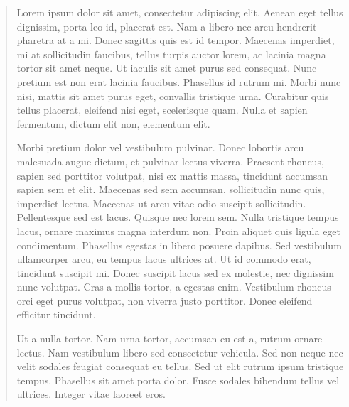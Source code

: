 \vspace*{2cm}
\thispagestyle{empty}
\begin{quotation}
\begin{itshape}
Lorem ipsum dolor sit amet, consectetur adipiscing elit. Aenean eget tellus
dignissim, porta leo id, placerat est. Nam a libero nec arcu hendrerit pharetra
at a mi. Donec sagittis quis est id tempor. Maecenas imperdiet, mi at
sollicitudin faucibus, tellus turpis auctor lorem, ac lacinia magna tortor sit
amet neque. Ut iaculis sit amet purus sed consequat. Nunc pretium est non erat
lacinia faucibus. Phasellus id rutrum mi. Morbi nunc nisi, mattis sit amet
purus eget, convallis tristique urna. Curabitur quis tellus placerat, eleifend
nisi eget, scelerisque quam. Nulla et sapien fermentum, dictum elit non,
elementum elit. 
\vspace{2cm}

Morbi pretium dolor vel vestibulum pulvinar. Donec lobortis arcu malesuada
augue dictum, et pulvinar lectus viverra. Praesent rhoncus, sapien sed
porttitor volutpat, nisi ex mattis massa, tincidunt accumsan sapien sem et
elit. Maecenas sed sem accumsan, sollicitudin nunc quis, imperdiet lectus.
Maecenas ut arcu vitae odio suscipit sollicitudin. Pellentesque sed est lacus.
Quisque nec lorem sem. Nulla tristique tempus lacus, ornare maximus magna
interdum non. Proin aliquet quis ligula eget condimentum. Phasellus egestas in
libero posuere dapibus. Sed vestibulum ullamcorper arcu, eu tempus lacus
ultrices at. Ut id commodo erat, tincidunt suscipit mi. Donec suscipit lacus
sed ex molestie, nec dignissim nunc volutpat. Cras a mollis tortor, a egestas
enim. Vestibulum rhoncus orci eget purus volutpat, non viverra justo porttitor.
Donec eleifend efficitur tincidunt.
\vspace{2cm}

Ut a nulla tortor. Nam urna tortor, accumsan eu est a, rutrum ornare lectus.
Nam vestibulum libero sed consectetur vehicula. Sed non neque nec velit sodales
feugiat consequat eu tellus. Sed ut elit rutrum ipsum tristique tempus.
Phasellus sit amet porta dolor. Fusce sodales bibendum tellus vel ultrices.
Integer vitae laoreet eros. 
\end{itshape}
\end{quotation}
